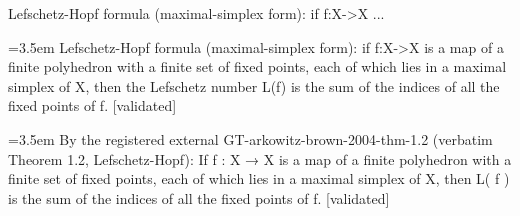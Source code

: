 \documentclass{article}
\newcommand{\step}[1]{\par\noindent\hangindent=3.5em\hangafter=1%
  \makebox[3.5em][l]{\textbf{#1.}}}
\newcommand{\steptag}[1]{\hfill{\small\textsf{[#1]}}}
\begin{document}
\begin{proofbox}{Lefschetz-Hopf formula (maximal-simplex form): if f:X->X ...}
\step{1} Lefschetz-Hopf formula (maximal-simplex form): if f:X->X is a map of a finite polyhedron with a finite set of fixed points, each of which lies in a maximal simplex of X, then the Lefschetz number L(f) is the sum of the indices of all the fixed points of f. \steptag{validated} \\[6pt]
\step{1.1} By the registered external GT-arkowitz-brown-2004-thm-1.2 (verbatim Theorem 1.2, Lefschetz-Hopf): If f : X → X is a map of a finite polyhedron with a finite set of fixed points, each of which lies in a maximal simplex of X, then L( f ) is the sum of the indices of all the fixed points of f. \steptag{validated} \\[4pt]
\end{proofbox}
\end{document}
